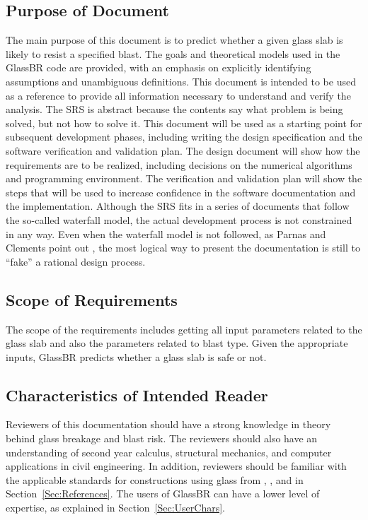 \documentclass[12pt]{article}
\begin{document}
\subsection{Purpose of Document}
\label{Sec:DocPurpose}
The main purpose of this document is to predict whether a given glass slab is likely to resist a specified blast. The goals and theoretical models used in the GlassBR code are provided, with an emphasis on explicitly identifying assumptions and unambiguous definitions. This document is intended to be used as a reference to provide all information necessary to understand and verify the analysis. The SRS is abstract because the contents say what problem is being solved, but not how to solve it.
This document will be used as a starting point for subsequent development phases, including writing the design specification and the software verification and validation plan. The design document will show how the requirements are to be realized, including decisions on the numerical algorithms and programming environment. The verification and validation plan will show the steps that will be used to increase confidence in the software documentation and the implementation. Although the SRS fits in a series of documents that follow the so-called waterfall model, the actual development process is not constrained in any way. Even when the waterfall model is not followed, as Parnas and Clements point out \cite{parnasClements1986}, the most logical way to present the documentation is still to ``fake'' a rational design process.
\subsection{Scope of Requirements}
\label{Sec:ReqsScope}
The scope of the requirements includes getting all input parameters related to the glass slab and also the parameters related to blast type. Given the appropriate inputs, GlassBR predicts whether a glass slab is safe or not.
\subsection{Characteristics of Intended Reader}
\label{Sec:ReaderChars}
Reviewers of this documentation should have a strong knowledge in theory behind glass breakage and blast risk. The reviewers should also have an understanding of second year calculus, structural mechanics, and computer applications in civil engineering. In addition, reviewers should be familiar with the applicable standards for constructions using glass from \cite{astm2009}, \cite{astm2012}, and \cite{astm2016} in Section~\ref{Sec:References}. The users of GlassBR can have a lower level of expertise, as explained in Section~\ref{Sec:UserChars}.
\end{document}
